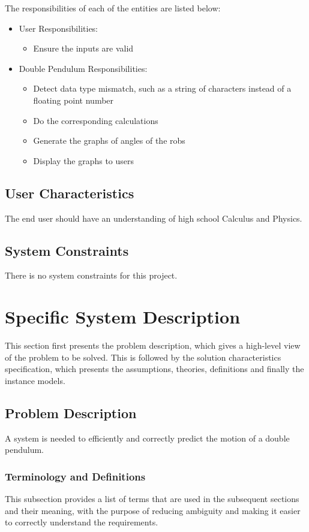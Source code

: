 \documentclass[12pt]{article}
\begin{document}
The responsibilities of each of the entities are listed below:
\begin{itemize}
\item User Responsibilities:
\begin{itemize}
\item Ensure the inputs are valid
\end{itemize}
\item Double Pendulum Responsibilities:
\begin{itemize}
\item Detect data type mismatch, such as a string of characters instead of a
  floating point number
\item Do the corresponding calculations  
\item Generate the graphs of angles of the robs
\item Display the graphs to users
\end{itemize}
\end{itemize}


\subsection{User Characteristics}\label{sec_userChar}
The end user should have an understanding of high school Calculus and Physics. 

\subsection{System Constraints}\label{sec_sysConstraints}
There is no system constraints for this project. 

\section{Specific System Description}\label{sec_specificSysDes}
This section first presents the problem description, which gives a high-level view of the problem to be solved. This is followed by the solution characteristics specification, which presents the assumptions, theories, definitions and finally the instance models. 

\subsection{Problem Description}\label{sec_problemDes}
A system is needed to efficiently and correctly predict the motion of a double pendulum. 

\subsubsection{Terminology and Definitions}\label{sec_termiAndDef}
This subsection provides a list of terms that are used in the subsequent sections and their meaning, with the purpose of reducing ambiguity and making it easier to correctly understand the requirements. 
\end{document}
